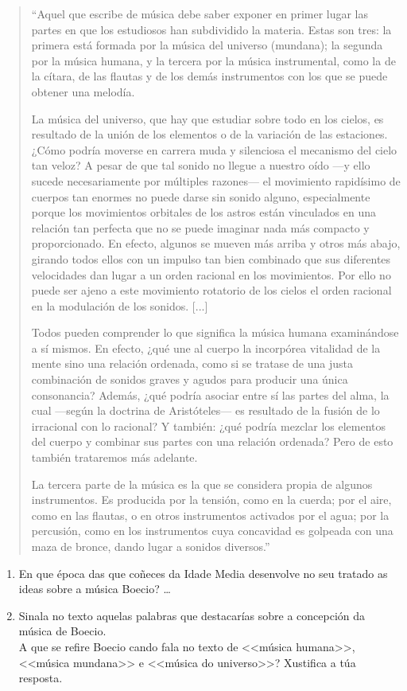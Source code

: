 \begin{quote}
\small{
``Aquel que escribe de música debe saber exponer en primer lugar las partes en que los estudiosos han subdividido la materia. Estas son tres: la primera está formada por la música del universo (mundana); la segunda por la música humana, y la tercera por la música instrumental, como la de la cítara, de las flautas y de los demás instrumentos con los que se puede obtener una melodía.

La música del universo, que hay que estudiar sobre todo en los cielos, es resultado de la unión de los elementos o de la variación de las estaciones. ¿Cómo podría moverse en carrera muda y silenciosa el mecanismo del cielo tan veloz? A pesar de que tal sonido no llegue a nuestro oído —y ello sucede necesariamente por múltiples razones— el movimiento rapidísimo de cuerpos tan enormes no puede darse sin sonido alguno, especialmente porque los movimientos orbitales de los astros están vinculados en una relación tan perfecta que no se puede imaginar nada más compacto y proporcionado. En efecto, algunos se mueven más arriba y otros más abajo, girando todos ellos con un impulso tan bien combinado que sus diferentes velocidades dan lugar a un orden racional en los movimientos. Por ello no puede ser ajeno a este movimiento rotatorio de los cielos el orden racional en la modulación de los sonidos. [...]

Todos pueden comprender lo que significa la música humana examinándose a sí mismos. En efecto, ¿qué une al cuerpo la incorpórea vitalidad de la mente sino una relación ordenada, como si se tratase de una justa combinación de sonidos graves y agudos para producir una única consonancia? Además, ¿qué podría asociar entre sí las partes del alma, la cual —según la doctrina de Aristóteles— es resultado de la fusión de lo irracional con lo racional? Y también: ¿qué podría mezclar los elementos del cuerpo y combinar sus partes con una relación ordenada? Pero de esto también trataremos más adelante.

La tercera parte de la música es la que se considera propia de algunos instrumentos. Es producida por la tensión, como en la cuerda; por el aire, como en las flautas, o en otros instrumentos activados por el agua; por la percusión, como en los instrumentos cuya concavidad es golpeada con una maza de bronce, dando lugar a sonidos diversos.''
}
\end{quote}
%
\begin{ejercicio}
  \begin{enumerate}[1.-]
  \item
    En que época das que coñeces da Idade Media desenvolve no seu tratado as ideas sobre a música Boecio? \ldots
  \item
    Sinala no texto aquelas palabras que destacarías sobre a concepción da música de Boecio. \\
    A que se refire Boecio cando fala no texto de <<música humana>>, <<música mundana>> e <<música do universo>>? Xustifica a túa resposta.
    \vspace*{6.10cm}
  \end{enumerate}
\end{ejercicio}
